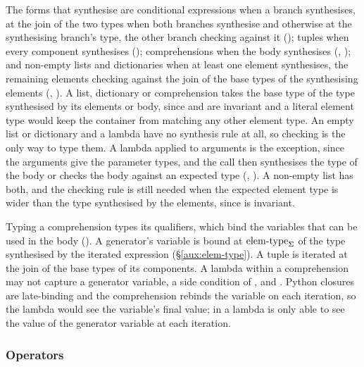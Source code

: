 

The forms that synthesise are conditional expressions when a branch
synthesises, at the join of the two types when both branches synthesise and otherwise at the
synthesising branch's type, the other branch checking against it ();
tuples when every component synthesises (); comprehensions when the body
synthesises (, ); and non-empty lists and
dictionaries when at least one element synthesises, the remaining elements checking against the join
of the base types of the synthesising elements (, ). A list,
dictionary or comprehension takes the base type of the type synthesised by its elements or body, since
 and  are invariant and a literal element type would keep the container from
matching any other element type. An empty list or dictionary and a lambda have no
synthesis rule at all, so checking is the only way to type them. A lambda applied to arguments is the
exception, since the arguments give the parameter types, and the call then synthesises the type of the body
or checks the body against an expected type (, ). A non-empty list has both, and the
checking rule is still needed when the expected element type is wider than the type synthesised by the
elements, since  is invariant.

Typing a comprehension types its qualifiers, which bind the variables that can be used in the body
(). A generator's variable is bound at $\mathrm{elem\text{-}type}_{\Sigma}$ of the type synthesised by the
iterated expression (\S\ref{aux:elem-type}). A
tuple is iterated at the join of the base types of its components.
A lambda within a comprehension may not capture a generator variable, a side condition of
,  and . Python closures are
late-binding and the comprehension rebinds the variable on each iteration, so the lambda would see the
variable's final value; in \PurePy a lambda is only able to see the value of the generator variable at
each iteration.

\subsubsection{Operators}\label{sec:well-formedness-operators}%



